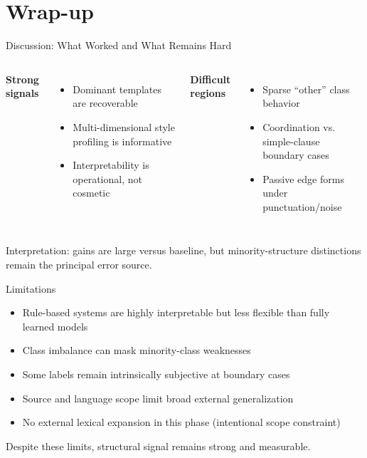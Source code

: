 \documentclass[aspectratio=169, 11pt]{beamer}
\begin{document}
\section{Wrap-up}

\begin{frame}{Discussion: What Worked and What Remains Hard}
  \begin{columns}
    \textbf{Strong signals}
    \begin{itemize}
      \item Dominant templates are recoverable
      \item Multi-dimensional style profiling is informative
      \item Interpretability is operational, not cosmetic
    \end{itemize}

    \textbf{Difficult regions}
    \begin{itemize}
      \item Sparse ``other'' class behavior
      \item Coordination vs. simple-clause boundary cases
      \item Passive edge forms under punctuation/noise
    \end{itemize}
  \end{columns}

  \vspace{0.8em}
  \textcolor{accentblue}{Interpretation: gains are large versus baseline, but minority-structure distinctions remain the principal error source.}
\end{frame}

\begin{frame}{Limitations}
  \begin{itemize}
    \item Rule-based systems are highly interpretable but less flexible than fully learned models
    \item Class imbalance can mask minority-class weaknesses
    \item Some labels remain intrinsically subjective at boundary cases
    \item Source and language scope limit broad external generalization
    \item No external lexical expansion in this phase (intentional scope constraint)
  \end{itemize}

  \vspace{1em}
  \textcolor{accent}{Despite these limits, structural signal remains strong and measurable.}
\end{frame}
\end{document}
